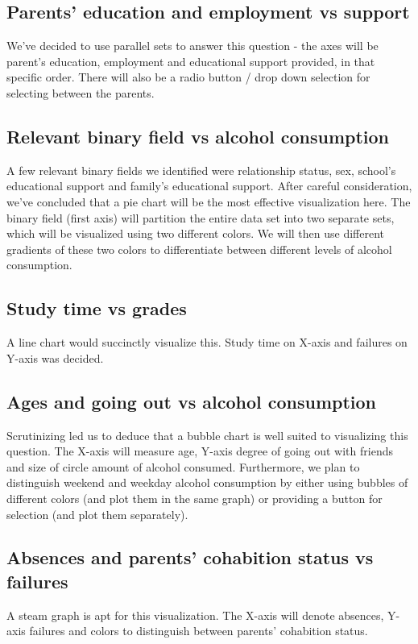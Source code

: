 \documentclass[titlepage, 12pt]{article}
\begin{document}
\subsection{Parents' education and employment vs support}
We've decided to use parallel sets to answer this question - the axes will be
parent's education, employment and educational support provided, in that
specific order. There will also be a radio button / drop down selection for
selecting between the parents.

\subsection{Relevant binary field vs alcohol consumption}
A few relevant binary fields we identified were relationship status, sex,
school's educational support and family's educational support.  After careful
consideration, we've concluded that a pie chart will be the most effective
visualization here. The binary field (first axis) will partition the entire data
set into two separate sets, which will be visualized using two different colors.
We will then use different gradients of these two colors to differentiate
between different levels of alcohol consumption.  

\subsection{Study time vs grades}
A line chart would succinctly visualize this. Study time on X-axis and failures
on Y-axis was decided.

\subsection{Ages and going out vs alcohol consumption}
Scrutinizing led us to deduce that a bubble chart is well suited to visualizing
this question. The X-axis will measure age, Y-axis degree of going out with
friends and size of circle amount of alcohol consumed. Furthermore, we plan to
distinguish weekend and weekday alcohol consumption by either using bubbles of
different colors (and plot them in the same graph) or providing a button for
selection (and plot them separately).

\subsection{Absences and parents' cohabition status vs failures}
A steam graph is apt for this visualization. The X-axis will denote absences,
Y-axis failures and colors to distinguish between parents' cohabition status.
\end{document}
